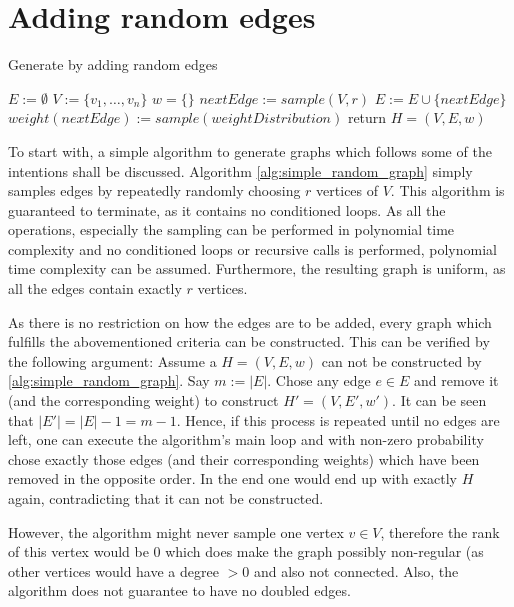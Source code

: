 \section{Adding random edges}
\begin{algorithm}[htpb]
	\caption{Generate by adding random edges\label{alg:simple_random_graph}} 
	\begin{algorithmic}
		\State $E := \emptyset$
		\State $V := \{v_1, \ldots, v_n\}$
		\State $w = \{\}$
		\State $nextEdge := sample(V, r) $
		\State $E := E \cup	 \{nextEdge\}$ %
		\State $weight(nextEdge) := sample(weightDistribution)$ 
		\EndFor
		\State return $H = (V, E, w)$
		\EndFunction 
	\end{algorithmic}
\end{algorithm}	
To start with, a simple algorithm to generate graphs which follows some of the intentions shall be discussed. Algorithm \ref{alg:simple_random_graph} simply samples edges by repeatedly randomly choosing $r$ vertices of $V$. 
This algorithm is guaranteed to terminate, as it contains no conditioned loops. As all the operations, especially the sampling can be performed in polynomial time complexity and no conditioned loops or recursive calls is performed, polynomial time complexity can be assumed. Furthermore, the resulting graph is uniform, as all the edges contain exactly $r$ vertices. 

As there is no restriction on how the edges are to be added, every graph which fulfills the abovementioned criteria can be constructed. This can be verified by the following argument: Assume a $H = (V, E, w)$ can not be constructed by \cref{alg:simple_random_graph}. Say $m:=|E|$. Chose any edge $e \in E$ and remove it (and the corresponding weight) to construct $H' = (V, E', w')$. It can be seen that $|E'|= |E|-1 = m-1 $. Hence, if this process is repeated until no edges are left, one can execute the algorithm's main loop and with non-zero probability chose exactly those edges (and their corresponding weights) which have been removed in the opposite order. In the end one would end up with exactly $H$ again, contradicting that it can not be constructed.



However, the algorithm might never sample one vertex $v \in V$, therefore the rank of this vertex would be $0$ which does make the graph possibly non-regular (as other vertices would have a degree $>0$ and also not connected. Also, the algorithm does not guarantee to have no doubled edges.

